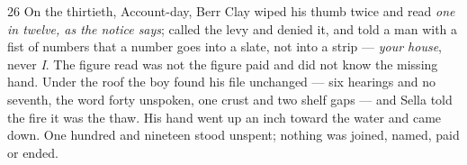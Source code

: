 \begin{CRchronicle}{26}
On the thirtieth, Account-day, Berr Clay wiped his thumb twice and read \emph{one in twelve, as the notice says}; called the levy and denied it, and told a man with a fist of numbers that a number goes into a slate, not into a strip --- \emph{your house}, never \emph{I}. The figure read was not the figure paid and did not know the missing hand. Under the roof the boy found his file unchanged --- six hearings and no seventh, the word forty unspoken, one crust and two shelf gaps --- and Sella told the fire it was the thaw. His hand went up an inch toward the water and came down. One hundred and nineteen stood unspent; nothing was joined, named, paid or ended.
\end{CRchronicle}

